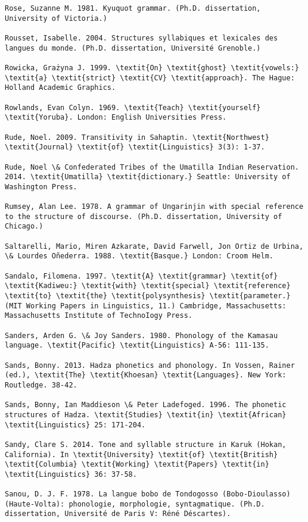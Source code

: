 \begin{verbatim}
Rose, Suzanne M. 1981. Kyuquot grammar. (Ph.D. dissertation, University of Victoria.)

Rousset, Isabelle. 2004. Structures syllabiques et lexicales des langues du monde. (Ph.D. dissertation, Université Grenoble.)

Rowicka, Grażyna J. 1999. \textit{On} \textit{ghost} \textit{vowels:} \textit{a} \textit{strict} \textit{CV} \textit{approach}. The Hague: Holland Academic Graphics.

Rowlands, Evan Colyn. 1969. \textit{Teach} \textit{yourself} \textit{Yoruba}. London: English Universities Press.

Rude, Noel. 2009. Transitivity in Sahaptin. \textit{Northwest} \textit{Journal} \textit{of} \textit{Linguistics} 3(3): 1-37.

Rude, Noel \& Confederated Tribes of the Umatilla Indian Reservation. 2014. \textit{Umatilla} \textit{dictionary.} Seattle: University of Washington Press.

Rumsey, Alan Lee. 1978. A grammar of Ungarinjin with special reference to the structure of discourse. (Ph.D. dissertation, University of Chicago.)

Saltarelli, Mario, Miren Azkarate, David Farwell, Jon Ortiz de Urbina, \& Lourdes Oñederra. 1988. \textit{Basque.} London: Croom Helm.

Sandalo, Filomena. 1997. \textit{A} \textit{grammar} \textit{of} \textit{Kadiweu:} \textit{with} \textit{special} \textit{reference} \textit{to} \textit{the} \textit{polysynthesis} \textit{parameter.} (MIT Working Papers in Linguistics, 11.) Cambridge, Massachusetts: Massachusetts Institute of TechnoIogy Press.

Sanders, Arden G. \& Joy Sanders. 1980. Phonology of the Kamasau language. \textit{Pacific} \textit{Linguistics} A-56: 111-135.

Sands, Bonny. 2013. Hadza phonetics and phonology. In Vossen, Rainer (ed.), \textit{The} \textit{Khoesan} \textit{Languages}. New York: Routledge. 38-42.

Sands, Bonny, Ian Maddieson \& Peter Ladefoged. 1996. The phonetic structures of Hadza. \textit{Studies} \textit{in} \textit{African} \textit{Linguistics} 25: 171-204.

Sandy, Clare S. 2014. Tone and syllable structure in Karuk (Hokan, California). In \textit{University} \textit{of} \textit{British} \textit{Columbia} \textit{Working} \textit{Papers} \textit{in} \textit{Linguistics} 36: 37-58.

Sanou, D. J. F. 1978. La langue bobo de Tondogosso (Bobo-Dioulasso) (Haute-Volta): phonologie, morphologie, syntagmatique. (Ph.D. dissertation, Université de Paris V: Réné Déscartes).


\end{verbatim}

